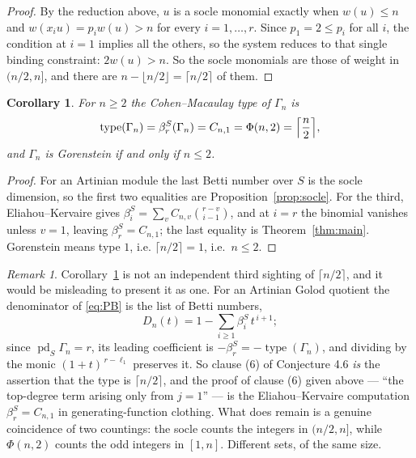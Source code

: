 \documentclass[a4paper,11pt,oneside,reqno]{amsart}
\theoremstyle{definition}
\theoremstyle{remark}
\newtheorem{remark}[definition]{Remark}
\theoremstyle{plain}
\newtheorem{corollary}[definition]{Corollary}
\newcommand{\Gam}{\Gamma}
\begin{document}
\begin{proof}
  By the reduction above, \(u\) is a socle monomial exactly when \(w(u) \le n\)
  and \(w(x_iu) = p_iw(u) > n\) for every \(i = 1,\dots,r\). Since \(p_1 = 2 \le p_i\)
  for all \(i\), the condition at \(i = 1\) implies all the others, so the system
  reduces to that single binding constraint: \(2w(u) > n\). So the socle monomials are those of weight
  in \((n/2,n]\), and there are \(n-\lfloor n/2\rfloor = \lceil n/2\rceil\)
  of them.
\end{proof}

\begin{corollary}\label{cor:type}
  For \(n \ge 2\) the Cohen--Macaulay type of \(\Gam_n\) is
  \[
    \operatorname{type}(\Gam_n) = \beta^{S}_{r}(\Gam_n)
      =C_{n,1} = \Phi(n,2) = \Bigl\lceil\frac{n}{2}\Bigr\rceil,
  \]
  and \(\Gam_n\) is Gorenstein if and only if \(n \le 2\).
\end{corollary}

\begin{proof}
  For an Artinian module the last Betti number over \(S\) is the socle
  dimension, so the first two equalities are Proposition~\ref{prop:socle}. For
  the third, Eliahou--Kervaire gives
  \(\beta^{S}_{i} = \sum_{v}C_{n,v}\binom{r-v}{i-1}\), and at \(i = r\) the
  binomial vanishes unless \(v = 1\), leaving \(\beta^{S}_{r} = C_{n,1}\); the last
  equality is Theorem~\ref{thm:main}. Gorenstein means type \(1\), i.e.
  \(\lceil n/2\rceil = 1\), i.e.\ \(n \le 2\).
\end{proof}

\begin{remark}
  Corollary~\ref{cor:type} is not an independent third sighting of
  \(\lceil n/2\rceil\), and it would be misleading to present it as one.
  For an Artinian Golod quotient the denominator of \eqref{eq:PB} is the list
  of Betti numbers,
  \[
    D_n(t) = 1-\sum_{i \ge 1}\beta^{S}_{i}\,t^{\,i+1};
  \]
  since \(\operatorname{pd}_S\Gam_n = r\), its leading coefficient is
  \(-\beta^{S}_{r} = -\operatorname{type}(\Gam_n)\), and dividing by the monic
  \((1+t)^{\,r-\ell_1}\) preserves it. So clause (6) of Conjecture 4.6
  \emph{is} the assertion that the type is \(\lceil n/2\rceil\), and the proof
  of clause (6) given above --- ``the top-degree term arising only from
  \(j = 1\)'' --- is the Eliahou--Kervaire computation \(\beta^{S}_{r} = C_{n,1}\)
  in generating-function clothing. What does remain is a genuine coincidence of
  two countings: the socle counts the integers in \((n/2,n]\), while
  \(\Phi(n,2)\) counts the odd integers in \([1,n]\). Different sets, of the
  same size.
\end{remark}
\end{document}

